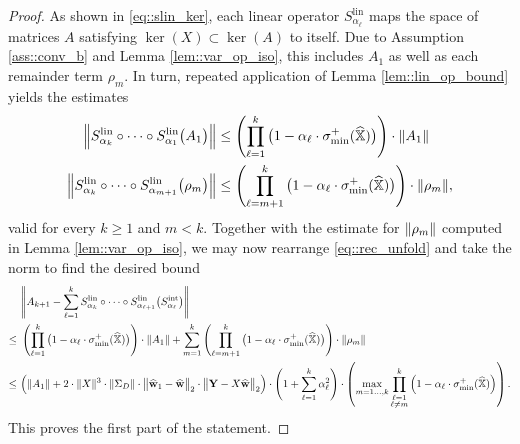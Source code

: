 \documentclass{article}
\newcommand*{\bbX}{\mathbb{X}}
\newcommand*{\bfY}{\mathbf{Y}}
\newcommand*{\bfw}{\mathbf{w}}
\newcommand*{\sigminp}{\sigma_{\mathrm{min}}^+}
\DeclarePairedDelimiter{\norm}{\lVert}{\rVert}
\newcommand{\whweight}{\widehat{\bfw}}
\newcommand{\whbbX}{\widehat{\bbX}}
\newcommand{\Slin}{S^{\mathrm{lin}}}
\newcommand{\Sint}{S^{\mathrm{int}}}
\begin{document}
\begin{proof}
  As shown in \eqref{eq::slin_ker}, each linear operator $\Slin_{\alpha_\ell}$
  maps the space of matrices $A$ satisfying $\ker(X) \subset \ker(A)$ to itself.
  Due to Assumption \ref{ass::conv_b} and Lemma \ref{lem::var_op_iso}, this
  includes $A_1$ as well as each remainder term $\rho_m$. In turn, repeated
  application of Lemma \ref{lem::lin_op_bound} yields the estimates
  \begin{align*}
    \norm[\Big]{\Slin_{\alpha_k} \circ \cdots \circ \Slin_{\alpha_1}
    \big(A_1\big)} &\leq \left(\prod_{\ell = 1}^k \big(1 - \alpha_\ell \cdot
    \sigminp(\whbbX)\big)\right) \cdot \norm{A_1}\\
    \norm[\Big]{\Slin_{\alpha_k} \circ \cdots \circ \Slin_{\alpha_{m +
    1}}\big(\rho_m\big)} &\leq \left(\prod_{\ell = m + 1}^k \big(1 - \alpha_\ell
    \cdot \sigminp(\whbbX)\big)\right) \cdot \norm{\rho_m},
  \end{align*} valid for every $k \geq 1$ and $m < k$. Together with the
  estimate for $\norm{\rho_m}$ computed in Lemma \ref{lem::var_op_iso}, we may
  now rearrange \eqref{eq::rec_unfold} and take the norm to find the desired
  bound \begin{align*}
    &\norm[\Bigg]{A_{k + 1} - \sum_{\ell = 1}^k \Slin_{\alpha_k} \circ \cdots
    \circ \Slin_{\alpha_{\ell + 1}} \big(\Sint_{\alpha_\ell}\big)}\\
    \leq\ &\left(\prod_{\ell = 1}^k \big(1 - \alpha_\ell \cdot
    \sigminp(\whbbX)\big)\right) \cdot \norm{A_1} + \sum_{m = 1}^{k}
    \left(\prod_{\ell = m + 1}^k \big(1 - \alpha_\ell \cdot
    \sigminp(\whbbX)\big)\right) \cdot \norm{\rho_m}\\
    \leq\ &\Big(\norm{A_1} + 2 \cdot \norm{X}^3 \cdot \norm{\Sigma_D} \cdot
    \norm[\big]{\whweight_1 - \whweight}_2 \cdot \norm[\big]{\bfY - X
    \whweight}_2\Big) \cdot \left(1 + \sum_{\ell = 1}^k \alpha_\ell^2\right)
    \cdot \left(\max_{m = 1 \ldots, k} \prod_{\substack{\ell = 1\\ \ell \neq
    m}}^{k} \Big(1 - \alpha_\ell \cdot \sigminp(\whbbX)\Big)\right).
  \end{align*} This proves the first part of the statement.
\end{proof}
\end{document}
